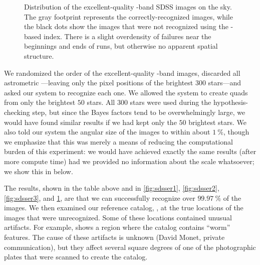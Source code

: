\begin{figure}[htp]
\begin{center}
\sdsserradecfig
\end{center}
    \caption{Distribution of the excellent-quality \rband-band SDSS
    images on the sky.  The gray footprint represents the
    correctly-recognized images, while the black dots show the images
    that were not recognized using the \usnob-based index.  There is a
    slight overdensity of failures near the beginnings and ends of
    runs, but otherwise no apparent spatial structure.
\label{fig:sdsser4}}
\end{figure}




We randomized the order of the excellent-quality \rband-band images,
discarded all astrometric \metadata---leaving only the pixel positions
of the brightest $300$ stars---and asked our system to recognize each
one.  We allowed the system to create quads from only the brightest
$50$ stars.  All $300$ stars were used during the hypothesis-checking
step, but since the Bayes factors tend to be overwhelmingly large, we
would have found similar results if we had kept only the $50$
brightest stars.  We also told our system the angular size of the
images to within about $1~\percent$, though we emphasize that this was
merely a means of reducing the computational burden of this
experiment: we would have achieved exactly the same results (after
more compute time) had we provided no information about the scale
whatsoever; we show this in  below.


\nonumberparagraphs
\begin{center}
\sdssertable
\end{center}
\numberparagraphs


The results, shown in the table above and in \figs \ref{fig:sdsser1},
\ref{fig:sdsser2}, \ref{fig:sdsser3}, and \ref{fig:sdsser4}, are
that we can successfully recognize over $99.97~\percent$ of the
images.  We then examined our reference catalog, \usnob, at the true
locations of the images that were unrecognized.  Some of these
locations contained unusual artifacts.  For example,
 shows a region where the
\usnob catalog contains ``worm'' features.  The cause of these
artifacts is unknown (David Monet, private communication), but they
affect several square degrees of one of the photographic plates that
were scanned to create the \usnob catalog.


